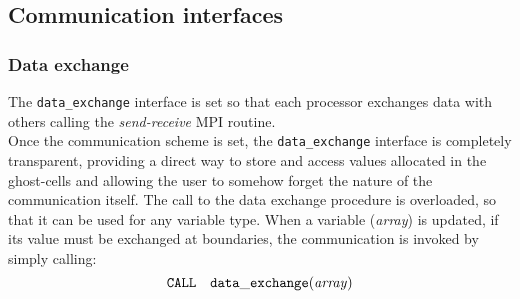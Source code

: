 \subsection{Communication interfaces}
%
\subsubsection{Data exchange}
%
The {\tt data\_exchange} interface is set so that each processor exchanges
data with others calling the {\em send-receive} MPI routine.\\ 
Once the communication scheme is set, the {\tt data\_exchange} interface 
is completely transparent, providing a direct way to store and access values 
allocated in the ghost-cells and allowing the user to somehow forget the 
nature of the communication itself. 
The call to the data exchange procedure is overloaded, so that it can be used
for any variable type.  When a variable ({\em array}) is
 updated, if its value must be exchanged at boundaries, the communication is invoked by
simply calling:
\begin{displaymath}
\tt CALL \quad data\_exchange({\it array})
\end{displaymath}
\clearpage%
